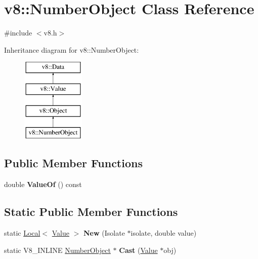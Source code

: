 \hypertarget{classv8_1_1NumberObject}{}\section{v8\+:\+:Number\+Object Class Reference}
\label{classv8_1_1NumberObject}


{\ttfamily \#include $<$v8.\+h$>$}

Inheritance diagram for v8\+:\+:Number\+Object\+:\begin{figure}[H]
\begin{center}
\leavevmode
\includegraphics[height=4.000000cm]{classv8_1_1NumberObject}
\end{center}
\end{figure}
\subsection*{Public Member Functions}
\begin{DoxyCompactItemize}
\item 
\mbox{\label{classv8_1_1NumberObject_abe15c092159cea5dc15908cce77b8a40}} 
double {\bfseries Value\+Of} () const
\end{DoxyCompactItemize}
\subsection*{Static Public Member Functions}
\begin{DoxyCompactItemize}
\item 
\mbox{\label{classv8_1_1NumberObject_afada011e39331dab09261e81b349c4a2}} 
static \mbox{\hyperlink{classv8_1_1Local}{Local}}$<$ \mbox{\hyperlink{classv8_1_1Value}{Value}} $>$ {\bfseries New} (Isolate $\ast$isolate, double value)
\item 
\mbox{\label{classv8_1_1NumberObject_a77500b6fed40f36fed616e865fd1ed07}} 
static V8\+\_\+\+I\+N\+L\+I\+NE \mbox{\hyperlink{classv8_1_1NumberObject}{Number\+Object}} $\ast$ {\bfseries Cast} (\mbox{\hyperlink{classv8_1_1Value}{Value}} $\ast$obj)
\end{DoxyCompactItemize}


